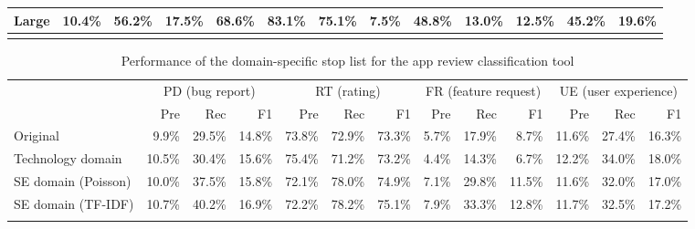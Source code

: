 \documentclass[conference]{IEEEtran}
\begin{document}
\begin{sloppy}
\begin{table}[]
\begin{tabular}{l|rrr|rrr|rrr|rrr}
Large                                                                              & \cellcolor{green}10.4\%     & \cellcolor{green}56.2\%     & \cellcolor{green}17.5\%    & \cellcolor{orange}68.6\%         & \cellcolor{green}83.1\%         & \cellcolor{green}75.1\% & \cellcolor{green}7.5\%       & \cellcolor{green}48.8\%       & \cellcolor{green}13.0\%      & \cellcolor{green}12.5\%       & \cellcolor{green}45.2\%      & \cellcolor{green}19.6\%  \\
\bottomrule
\label{table:three}
\end{tabular}
\end{table}

\begin{table}[]
\centering
\caption{Performance of the domain-specific stop list for the app review classification tool}
\begin{tabular}{l|rrr|rrr|rrr|rrr}
\toprule
\multirow{2}{*}{}                                                      & \multicolumn{3}{c}{PD (bug report)} & \multicolumn{3}{c}{RT (rating)}  & \multicolumn{3}{c}{FR (feature request)} & \multicolumn{3}{c}{UE (user experience)} \\
                                                                       & Pre        & Rec        & F1        & Pre            & Rec            & F1     & Pre         & Rec          & F1          & Pre          & Rec         & F1          \\
\midrule
Original                                                               & 9.9\%      & 29.5\%     & 14.8\%    & 73.8\%         & 72.9\%         & 73.3\% & 5.7\%       & 17.9\%       & 8.7\%       & 11.6\%       & 27.4\%      & 16.3\%      \\
Technology domain                                                      & \cellcolor{green}10.5\%     & \cellcolor{green}30.4\%     & \cellcolor{green}15.6\%    & \cellcolor{green}75.4\%         & \cellcolor{orange}71.2\%         & \cellcolor{orange}73.2\% & \cellcolor{orange}4.4\%       & \cellcolor{orange}14.3\%       & \cellcolor{orange}6.7\%       & \cellcolor{green}12.2\%       & \cellcolor{green}34.0\%      & \cellcolor{green}18.0\%      \\
SE domain (Poisson) & \cellcolor{green}10.0\%     & \cellcolor{green}37.5\%     & \cellcolor{green}15.8\%    & \cellcolor{orange}72.1\%         & \cellcolor{green}78.0\%         & \cellcolor{green}74.9\% & \cellcolor{green}7.1\%       & \cellcolor{green}29.8\%       & \cellcolor{green}11.5\%      & 11.6\%       & \cellcolor{green}32.0\%      & \cellcolor{green}17.0\%      \\
SE domain (TF-IDF) & \cellcolor{green}10.7\%     & \cellcolor{green}40.2\%     & \cellcolor{green}16.9\%    & \cellcolor{orange}72.2\%         & \cellcolor{green}78.2\%         & \cellcolor{green}75.1\% & \cellcolor{green}7.9\%       & \cellcolor{green}33.3\%       & \cellcolor{green}12.8\%      & \cellcolor{green}11.7\%       & \cellcolor{green}32.5\%      & \cellcolor{green}17.2\%      \\
\bottomrule
\label{table:four}
\end{tabular}
\end{table}


\end{sloppy}
\end{document}

